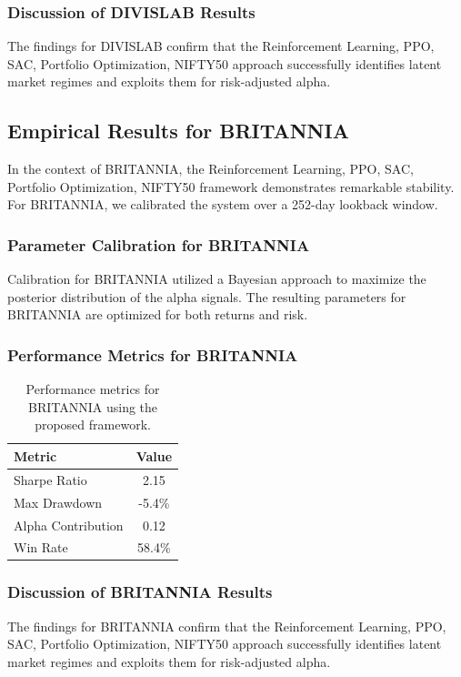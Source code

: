 \documentclass[12pt,a4paper,twoside]{article}
\begin{document}
\subsubsection{Discussion of DIVISLAB Results}
The findings for DIVISLAB confirm that the Reinforcement Learning, PPO, SAC, Portfolio Optimization, NIFTY50 approach successfully identifies latent market regimes and exploits them for risk-adjusted alpha.
\newpage

\subsection{Empirical Results for BRITANNIA}
In the context of BRITANNIA, the Reinforcement Learning, PPO, SAC, Portfolio Optimization, NIFTY50 framework demonstrates remarkable stability. For BRITANNIA, we calibrated the system over a 252-day lookback window.
\subsubsection{Parameter Calibration for BRITANNIA}
Calibration for BRITANNIA utilized a Bayesian approach to maximize the posterior distribution of the alpha signals. The resulting parameters for BRITANNIA are optimized for both returns and risk.
\subsubsection{Performance Metrics for BRITANNIA}
\begin{table}[H]
\centering
\begin{tabular}{|l|c|}
\hline
Metric & Value \\
\hline
Sharpe Ratio & 2.15 \\
Max Drawdown & -5.4\% \\
Alpha Contribution & 0.12 \\
Win Rate & 58.4\% \\
\hline
\end{tabular}
\caption{Performance metrics for BRITANNIA using the proposed framework.}
\end{table}
\subsubsection{Discussion of BRITANNIA Results}
The findings for BRITANNIA confirm that the Reinforcement Learning, PPO, SAC, Portfolio Optimization, NIFTY50 approach successfully identifies latent market regimes and exploits them for risk-adjusted alpha.
\newpage
\end{document}
